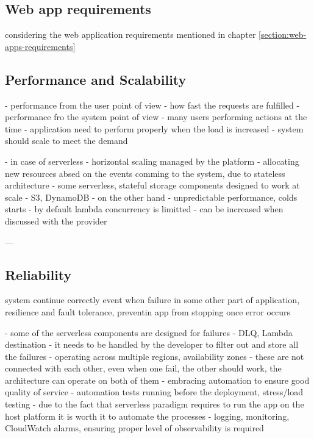 \subsection{Web app requirements}

considering the web application requirements mentioned in chapter \ref{section:web-apps-requirements}

\subsection*{Performance and Scalability}

- performance from the user point of view - how fast the requests are fulfilled
- performance fro the system point of view - many users performing actions at the time - application need to perform properly when the load is increased - system should scale to meet the demand

- in case of serverless - horizontal scaling managed by the platform - allocating new resources absed on the events comming to the system, due to stateless architecture
- some serverless, stateful storage components designed to work at scale - S3, DynamoDB
- on the other hand - unpredictable performance, colds starts
- by default lambda concurrency is limitted - can be increased when discussed with the provider

---

\subsection*{Reliability}

system continue correctly event when failure in some other part of application, resilience and fault tolerance, preventin app from stopping once error occurs

- some of the serverless components are designed for failures - DLQ, Lambda destination - it needs to be handled by the developer to filter out and store all the failures
- operating across multiple regions, availability zones - these are not connected with each other, even when one fail, the other should work, the architecture can operate on both of them
- embracing automation to ensure good quality of service - automation tests running before the deployment, stress/load testing - due to the fact that serverless paradigm requires to run the app on the host platform it is worth it to automate the processes
- logging, monitoring, CloudWatch alarms, ensuring proper level of observability is required

